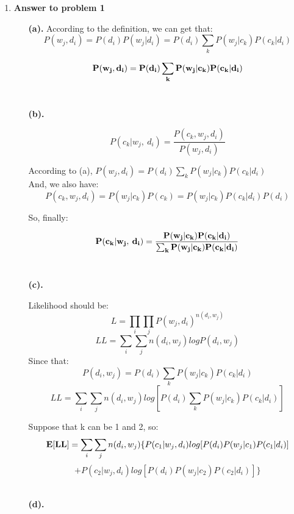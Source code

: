 

\usepackage{graphicx,amssymb,amsmath, listings}
\lstset{language = Matlab}
\lstset{breaklines}
\lstset{extendedchars=false}

\oddsidemargin 0in
\evensidemargin 0in
\textwidth 6.5in
\topmargin -0.5in
\textheight 9.0in



\pagestyle{myheadings}  %

\begin{enumerate}
\item {\bf Answer to problem 1}
\begin{enumerate}
\item[\bf (a). ]
According to the definition, we can get that:
$$P(w_j, d_i) = P(d_i)P(w_j|d_i) = P(d_i)\sum_k P(w_j|c_k)P(c_k|d_i) $$

$$\bf P(w_j, d_i) = P(d_i)\sum_k P(w_j|c_k)P(c_k|d_i)$$\\

\item[\bf (b). ]

$$P(c_k| w_j, \: d_i) = \frac{P(c_k, w_j, d_i)}{P(w_j, d_i)}$$

According to (a), $P(w_j, d_i) = P(d_i)\sum_k P(w_j|c_k)P(c_k|d_i)$\\

And, we also have:
$$P(c_k, w_j, d_i) = P(w_j|c_k)P(c_k) = P(w_j|c_k)P(c_k|d_i)P(d_i)$$

So, finally:

$$\bf P(c_k| w_j, \: d_i) = \frac{P(w_j|c_k)P(c_k|d_i)}{\sum_k P(w_j|c_k)P(c_k|d_i)}$$\\

\item[\bf (c). ]

Likelihood should be:
$$L = \prod_i \prod_j P(w_j, d_i)^{n(d_i, w_j)}$$
$$LL = \sum_i \sum_j n(d_i, w_j)log P(d_i, w_j)$$
Since that:
$$P(d_i, w_j) = P(d_i)\sum_k P(w_j|c_k)P(c_k|d_i)$$
$$LL = \sum_i \sum_j n(d_i, w_j)log[P(d_i)\sum_k P(w_j|c_k)P(c_k|d_i)]$$

Suppose that k can be 1 and 2, so:
$${\bf E[LL]} = \sum_i \sum_j n(d_i, w_j)\{ P(c_1|w_j, d_i)log[P(d_i) P(w_j|c_1)P(c_1|d_i)] $$
$$ + P(c_2|w_j, d_i)log[P(d_i) P(w_j|c_2)P(c_2|d_i)] \}$$\\

\item[\bf (d). ]


\end{enumerate}
\end{enumerate}
